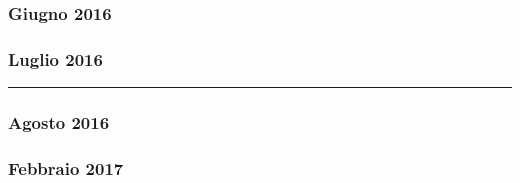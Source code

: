 \newpage

\subsubsection*{Giugno 2016}

\begin{mdframed}
	
	
\end{mdframed}


\subsubsection*{Luglio 2016}

\begin{mdframed}
	\begin{mdframed}
		
	\end{mdframed}

	

	\noindent\hfil\rule{\textwidth}{.4pt}\hfil

	
\end{mdframed}


\subsubsection*{Agosto 2016}

\begin{mdframed}
	\begin{mdframed}
		
	\end{mdframed}

	
\end{mdframed}



\newpage

\subsubsection*{Febbraio 2017}

